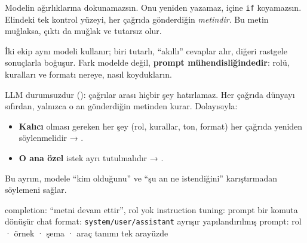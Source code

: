 

Modelin ağırlıklarına dokunamazsın. Onu yeniden yazamaz, içine \texttt{if}
koyamazsın. Elindeki tek kontrol yüzeyi, her çağrıda gönderdiğin \emph{metindir}.
Bu metin muğlaksa, çıktı da muğlak ve tutarsız olur.


İki ekip aynı modeli kullanır; biri tutarlı, ``akıllı'' cevaplar alır, diğeri
rastgele sonuçlarla boğuşur. Fark modelde değil, \textbf{prompt mühendisliğindedir}:
rolü, kuralları ve formatı nereye, nasıl koydukların.

LLM durumsuzdur (): çağrılar arası hiçbir şey hatırlamaz. Her
çağrıda dünyayı sıfırdan, yalnızca o an gönderdiğin metinden kurar. Dolayısıyla:

\begin{itemize}
  \item \textbf{Kalıcı} olması gereken her şey (rol, kurallar, ton, format) her çağrıda yeniden söylenmelidir → .
  \item \textbf{O ana özel} istek ayrı tutulmalıdır → .
\end{itemize}

Bu ayrım, modele ``kim olduğunu'' ve ``şu an ne istendiğini'' karıştırmadan
söylemeni sağlar.

\begin{timeline}
 completion: ``metni devam ettir'', rol yok \tlsep {} instruction tuning: prompt bir komuta dönüşür \tlsep {} chat format: \texttt{system/user/assistant} ayrışır \tlsep {} yapılandırılmış prompt: rol · örnek · şema · araç tanımı tek arayüzde
\end{timeline}

